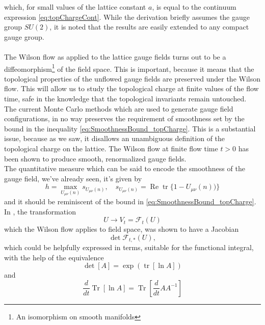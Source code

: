 \documentclass[a4paper,10pt]{book}
\begin{document}
which, for small values of the lattice constant $a$, is equal to the continuum expression \eqref{eq:topChargeCont}. While the derivation briefly assumes the gauge group $SU(2)$, it is noted that the results are easily extended to any compact gauge group.\\\\The Wilson flow as applied to the lattice gauge fields turns out to be a diffeomorphism\footnote{An isomorphism on smooth manifolds} of the field space. This is important, because it means that the topological properties of the unflowed gauge fields are preserved under the Wilson flow. This will allow us to study the topological charge at finite values of the flow time, safe in the knowledge that the topological invariants remain untouched.\\ The current Monte Carlo methods which are used to generate gauge field configurations, in no way preserves the requirement of smoothness set by the bound in the inequality \eqref{eq:SmoothnessBound_topCharge}. This is a substantial issue, because as we saw, it disallows an unambiguous definition of the topological charge on the lattice. The Wilson flow at finite flow time $t>0$ has been shown to produce smooth, renormalized gauge fields.\\The quantitative measure which can be said to encode the smoothness of the gauge field, we've already seen, it's given by
\begin{equation}
h=\max _{U_{\mu \nu}(n)} s_{U_{\mu \nu}(n)}, \quad s_{U_{\mu \nu}(n)}=\operatorname{Re} \operatorname{tr}\{1-U_{\mu \nu}(n))\}
\end{equation}
and it should be reminiscent of the bound in \eqref{eq:SmoothnessBound_topCharge}.\\In \cite{LuescherMartin2009TMtW}, the transformation 
\begin{equation}
U \rightarrow V_{t}=\mathcal{F}_{t}(U)
\end{equation}
which the Wilson flow applies to field space, was shown to have a Jacobian 
\begin{equation}
\operatorname{det} \mathcal{F}_{t, *}(U),
\end{equation}
which could be helpfully expressed in terms, suitable for the functional integral, with the help of the equivalence 
\begin{equation}
\operatorname{det}[A]=\exp (\operatorname{tr}[\ln A])
\end{equation}
and
\begin{equation}
\frac{d}{dt}\operatorname{Tr}\left[ \operatorname{ln} A  \right]  = \operatorname{Tr}\left[ \frac{d}{dt}A A^{-1} \right]
\end{equation}
\end{document}
